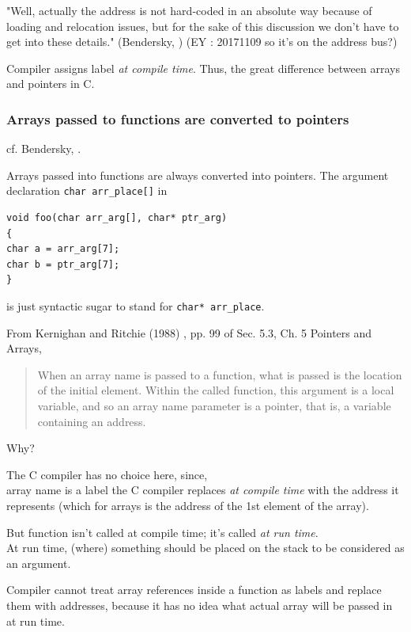 \documentclass[10pt]{amsart}
\begin{document}
"Well, actually the address is not hard-coded in an absolute way because of loading and relocation issues, but for the sake of this discussion we don't have to get into these details." (Bendersky, \cite{Bend}) (EY : 20171109 so it's on the address bus?)

Compiler assigns label \emph{at compile time}.  Thus, the great difference between arrays and pointers in C.  

\subsubsection{Arrays passed to functions are converted to pointers}  

cf. Bendersky, \cite{Bend}.  

Arrays passed into functions are always converted into pointers.  The argument declaration \verb|char arr_place[]| in  

\begin{lstlisting}
void foo(char arr_arg[], char* ptr_arg)
{
char a = arr_arg[7];
char b = ptr_arg[7];
}
\end{lstlisting} 

is just syntactic sugar to stand for \verb|char* arr_place|.  

From Kernighan and Ritchie (1988) \cite{KeRi1988}, pp. 99 of Sec. 5.3, Ch. 5 Pointers and Arrays,  

\begin{quotation}
	When an array name is passed to a function, what is passed is the location of the initial element.  Within the called function, this argument is a local variable, and so an array name parameter is a pointer, that is, a variable containing an address.  
\end{quotation}

Why?  

The C compiler has no choice here, since, \\
array name is a label the C compiler replaces \emph{at compile time}  with the address it represents (which for arrays is the address of the 1st element of the array).  

But function isn't called at compile time; it's called \emph{at run time}.  \\
At run time, (where) something should be placed on the stack to be considered as an argument.  

Compiler cannot treat array references inside a function as labels and replace them with addresses, because it has no idea what actual array will be passed in at run time.  
\end{document}
